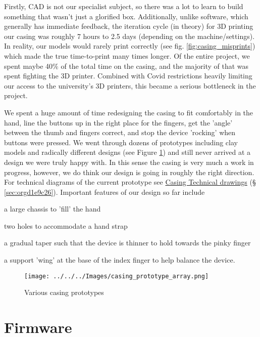 \documentclass[logo,bsc,singlespacing,parskip]{infthesis}
\begin{document}
Firstly, CAD is not our specialist subject, so there was a lot to learn to build something that wasn't just a glorified box.
Additionally, unlike software, which generally has immediate feedback, the iteration cycle (in theory) for 3D printing our casing was roughly 7 hours to 2.5 days (depending on the machine/settings).
In reality, our models would rarely print correctly (see fig. \ref{fig:casing_misprints}) which made the true time-to-print many times longer.
Of the entire project, we spent maybe 40\% of the total time on the casing, and the majority of that was spent fighting the 3D printer.
Combined with Covid restrictions heavily limiting our access to the university's 3D printers, this became a serious bottleneck in the project.

We spent a huge amount of time redesigning the casing to fit comfortably in the hand, line the buttons up in the right place for the fingers, get the 'angle' between the thumb and fingers correct, and stop the device 'rocking' when buttons were pressed.
We went through dozens of prototypes including clay models and radically different designs (see Figure \ref{fig:casing_prototypes}) and still never arrived at a design we were truly happy with.
In this sense the casing is very much a work in progress, however, we do think our design is going in roughly the right direction.
For technical diagrams of the current prototype see
\hyperref[sec:orgd1e9c26]{Casing Technical drawings} (§ \ref{sec:orgd1e9c26}).
Important features of our design so far include
\begin{enumerate*}[label={\arabic*)}, itemjoin={, \,}, itemjoin*={, and \,}]
\item a large chassis to 'fill' the hand
\item two holes to accommodate a hand strap
\item a gradual taper such that the device is thinner to hold towards the pinky finger
\item a support 'wing' at the base of the index finger to help balance the device.
\end{enumerate*}

\begin{figure}[h]
\centering
\texttt{[image: ../../../Images/casing\_prototype\_array.png]}
\caption{\label{fig:casing_prototypes}Various casing prototypes}
\end{figure}
\section{Firmware}
\label{sec:orgf1a33bf}
\end{document}
